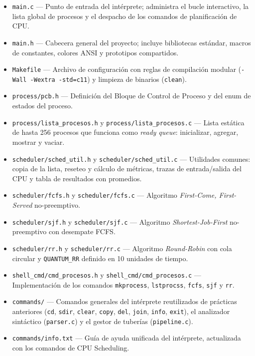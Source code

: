 \documentclass[12pt]{article}
\begin{document}
\begin{itemize}
    \item \texttt{main.c} — Punto de entrada del intérprete; administra el bucle interactivo, la lista global de procesos y el despacho de los comandos de planificación de CPU.
    \item \texttt{main.h} — Cabecera general del proyecto; incluye bibliotecas estándar, macros de constantes, colores ANSI y prototipos compartidos.
    \item \texttt{Makefile} — Archivo de configuración con reglas de compilación modular (\texttt{-Wall -Wextra -std=c11}) y limpieza de binarios (\texttt{clean}).
    \item \texttt{process/pcb.h} — Definición del Bloque de Control de Proceso y del enum de estados del proceso.
    \item \texttt{process/lista\_procesos.h} y \texttt{process/lista\_procesos.c} — Lista estática de hasta 256 procesos que funciona como \textit{ready queue}: inicializar, agregar, mostrar y vaciar.
    \item \texttt{scheduler/sched\_util.h} y \texttt{scheduler/sched\_util.c} — Utilidades comunes: copia de la lista, reseteo y cálculo de métricas, trazas de entrada/salida del CPU y tabla de resultados con promedios.
    \item \texttt{scheduler/fcfs.h} y \texttt{scheduler/fcfs.c} — Algoritmo \textit{First-Come, First-Served} no-preemptivo.
    \item \texttt{scheduler/sjf.h} y \texttt{scheduler/sjf.c} — Algoritmo \textit{Shortest-Job-First} no-preemptivo con desempate FCFS.
    \item \texttt{scheduler/rr.h} y \texttt{scheduler/rr.c} — Algoritmo \textit{Round-Robin} con cola circular y \texttt{QUANTUM\_RR} definido en 10 unidades de tiempo.
    \item \texttt{shell\_cmd/cmd\_procesos.h} y \texttt{shell\_cmd/cmd\_procesos.c} — Implementación de los comandos \texttt{mkprocess}, \texttt{lstprocss}, \texttt{fcfs}, \texttt{sjf} y \texttt{rr}.
    \item \texttt{commands/} — Comandos generales del intérprete reutilizados de prácticas anteriores (\texttt{cd}, \texttt{sdir}, \texttt{clear}, \texttt{copy}, \texttt{del}, \texttt{join}, \texttt{info}, \texttt{exit}), el analizador sintáctico (\texttt{parser.c}) y el gestor de tuberías (\texttt{pipeline.c}).
    \item \texttt{commands/info.txt} — Guía de ayuda unificada del intérprete, actualizada con los comandos de CPU Scheduling.
\end{itemize}
\end{document}
